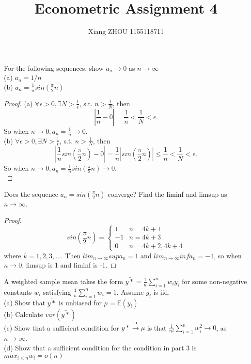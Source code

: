 \documentclass[12pt]{article}
\newenvironment{question}[2][Question]{\begin{trivlist}
\item[\hskip \labelsep {\bfseries #1}\hskip \labelsep {\bfseries #2.}]}{\end{trivlist}}
\begin{document}
 
\title{Econometric Assignment 4}
\author{Xiang ZHOU 1155118711}
\maketitle
 
\begin{question}{6.1}
For the following sequences, show $a_n \to 0$ as $n \to \infty$\\
(a) $a_n = 1/n$\\
(b) $a_n = \frac{1}{n}sin(\frac{\pi}{2}n)$
\end{question}

\begin{proof}
(a) $\forall \epsilon >0,\exists N>\frac{1}{\epsilon}$, s.t. $n>\frac{1}{N}$, then
$$|\frac{1}{n}-0| = \frac{1}{n}<\frac{1}{N}<\epsilon.$$
So when $n\to 0, a_n = \frac{1}{n}\to 0.$\\
(b) $\forall \epsilon >0,\exists N>\frac{1}{\epsilon}$, s.t. $n>\frac{1}{N}$, then
$$|\frac{1}{n}sin(\frac{\pi}{2}n)-0| = \frac{1}{n}|sin(\frac{\pi}{2}n)|\le \frac{1}{n}<\frac{1}{N}<\epsilon.$$
So when $n\to 0, a_n = \frac{1}{n}sin(\frac{\pi}{2}n)\to 0.$\\
\end{proof}

\begin{question}{6.2}
Does the sequence $a_n = sin(\frac{\pi}{2}n)$ converge? Find the liminf and limsup as $n\to \infty$.
\end{question}

\begin{proof}
 \[
    sin(\frac{\pi}{2}n)=\left\{
                \begin{array}{rl}
                 1& n = 4k+1\\
                 -1&n = 4k+3\\
                 0 & n = 4k+2, 4k+4
                \end{array}
              \right.
  \] 
  where $k = 1,2,3,...$. Then $lim_{n\to \infty} sup a_n = 1$ and $lim_{n\to \infty} inf a_n = -1$, so when $n\to 0$, limsup is 1 and liminf is -1.
\end{proof}


\begin{question}{6.3}
A weighted sample mean takes the form $\bar{y*} = \frac{1}{n}\sum_{i = 1}^{n}w_iy_i$ for some non-negative constants $w_i$ satisfying $\frac{1}{n}\sum_{i = 1}^{n}w_i = 1$. Assume $y_i$ is iid.\\
(a) Show that $\bar{y*}$ is unbiased for $\mu = \mathbb{E}(y_i)$\\
(b) Calculate $var(\bar{y*})$\\
(c) Show that a sufficient condition for $\bar{y*}\xrightarrow{\text{p}}\mu$ is that $\frac{1}{n^2}\sum_{i = 1}^{n}w_i^2\to 0$, as $n \to \infty$.\\
(d) Show that a sufficient condition for the condition in part 3 is $max_{i\le n}w_i = o(n)$
\end{question}
\end{document}
